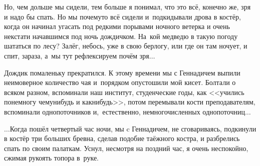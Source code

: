 Но, чем дольше мы сидели, тем больше я понимал, что это всё, конечно же, зря и надо бы спать. Но мы почему\sdash то всё сидели и~подкидывали дрова в костёр, когда он начинал угасать под редкими порывами ночного ветерка и очень некстати начавшимся под ночь дождичком. На~кой медведю в такую погоду шататься по лесу? Залёг, небось, уже в свою берлогу, или где он там ночует, и спит, зараза, а~мы тут рефлексируем почём зря$\ldots$ 

Дождик помаленьку прекратился. К этому времени мы с Геннадичем выпили неимоверное количество чая и~порядком опустошили мой кисет. Болтали о всяком разном, вспоминали наш институт, студенческие годы, как <<учились понемногу чему\sdash нибудь и как\sdash нибудь>>, потом перемывали кости преподавателям, вспоминали однопоточников и,~естественно, немногочисленных однопоточниц$\ldots$





$\ldots$Когда пошёл четвертый час ночи, мы c Геннадичем, не сговариваясь, подкинули в костёр три больших бревна, сделав подобие таёжного костра, и разбрелись спать по своим палаткам. Уснул, несмотря на поздний час, я очень неспокойно, сжимая рукоять топора в~руке. 

\begin{center}
\end{center}
